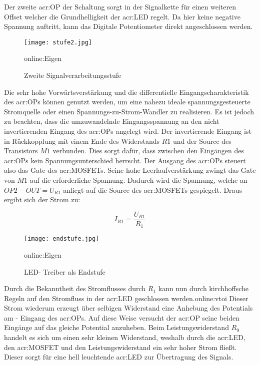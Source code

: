 Der zweite \gls{acr:OP} der Schaltung sorgt in der Signalkette für einen weiteren
Offset welcher die Grundhelligkeit der \gls{acr:LED} regelt. Da hier keine negative Spannung auftritt, kann das Digitale Potentiometer direkt angeschlossen werden.
\begin{figure}[H]
	\centering
	\texttt{[image: stufe2.jpg]}
	\caption[Zweite Signalverarbeitungsstufe]{Zweite Signalverarbeitungsstufe} \gls{online:Eigen}
	\label{fig:stufe2}
\end{figure}


Die sehr hohe Vorwärtsverstärkung und die differentielle Eingangscharakteristik des \gls{acr:OP}s können genutzt werden, um eine nahezu ideale spannungsgesteuerte Stromquelle oder einen Spannungs-zu-Strom-Wandler zu realisieren. Es ist jedoch zu beachten, dass die umzuwandelnde Eingangsspannung an den nicht invertierenden Eingang des \gls{acr:OP}s angelegt wird. Der invertierende Eingang ist in Rückkopplung mit einem Ende des Widerstands $R{1}$ und der Source des Transistors $M{1}$ verbunden. Dies sorgt dafür, dass zwischen den Eingängen des \gls{acr:OP}s kein Spannungsunterschied herrscht. Der Ausgang des \gls{acr:OP}s steuert also das Gate des \gls{acr:MOSFET}s. Seine hohe Leerlaufverstärkung zwingt das Gate von $M{1}$ auf die erforderliche Spannung. Dadurch wird die Spannung, welche an $OP2-OUT = U_{R1}$ anliegt auf die Source des \gls{acr:MOSFET}s gespiegelt. Draus ergibt sich der Strom zu: 

\begin{equation}
	\label{equ:bsp1}
	I_{R1} = \frac{U_{R1}}{R_{1}}
\end{equation}

\begin{figure}[H]
	\centering
	\texttt{[image: endstufe.jpg]}
	\caption[LED- Treiber als Endstufe]{LED- Treiber als Endstufe} \gls{online:Eigen}
	\label{fig:endstufe}
\end{figure}

Durch die Bekanntheit des Stromflusses durch $R_1$ kann nun durch kirchhoffsche Regeln auf den Stromfluss in der \gls{acr:LED} geschlossen werden.\gls{online:vtoi} Dieser Strom wiederum erzeugt über selbigen Widerstand eine Anhebung des Potentials am - Eingang des \gls{acr:OP}s. Auf diese Weise versucht der \gls{acr:OP} seine beiden Eingänge auf das gleiche Potential anzuheben. Beim Leistungswiderstand $R_{9}$ handelt es sich um einen sehr kleinen Widerstand, weshalb durch die \gls{acr:LED}, den \gls{acr:MOSFET} und den Leistungswiderstand ein sehr hoher Strom fließt. Dieser sorgt für eine hell leuchtende \gls{acr:LED} zur Übertragung des Signals.

